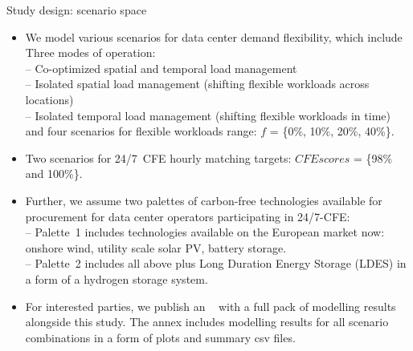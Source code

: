 \begin{frame}{Study design: scenario space}

  {\footnotesize 
  \begin{itemize}

  \item We model various scenarios for data center demand flexibility, which include \\
  \vspace{0.1cm}
  Three modes of operation: \\
    -- Co-optimized \alert{spatial and temporal} load management \\
    -- Isolated \alert{spatial} load management (shifting flexible workloads across locations)\\ 
    -- Isolated \alert{temporal} load management (shifting flexible workloads in time) \\ 
  \vspace{0.1cm}
  and four scenarios for flexible workloads range: \alert{$f$ = \{0\%, 10\%, 20\%, 40\%\}}.

  \item Two scenarios for 24/7~CFE hourly matching targets:
  \alert{$CFE scores$ = \{98\% and 100\%\}}.
  
  \item Further, we assume two palettes of carbon-free technologies available for procurement for data center operators participating in 24/7-CFE: \\
  \vspace{0.1cm}
  -- \alert{Palette~1} includes technologies available on the European market now: onshore wind, utility scale solar PV, battery storage. \\
  -- \alert{Palette~2} includes all above plus Long Duration Energy Storage (LDES) in a form of a hydrogen storage system. 

  \item For interested parties, we publish an \faLink~ with a full pack of modelling results alongside this study. The annex includes modelling results for all scenario combinations in a form of plots and summary csv files. 

  \end{itemize}
  }
\end{frame}



